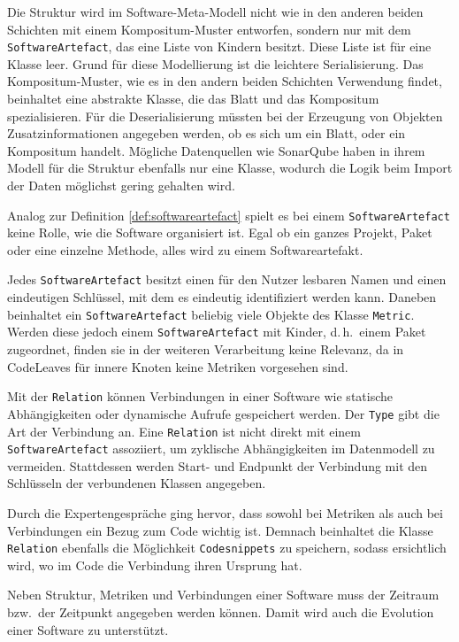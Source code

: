 Die Struktur wird im Software-Meta-Modell nicht wie in den anderen beiden Schichten mit einem Kompositum-Muster entworfen, sondern nur mit dem \texttt{SoftwareArtefact}, das eine Liste von Kindern besitzt. Diese Liste ist für eine Klasse leer. Grund für diese Modellierung ist die leichtere Serialisierung. Das Kompositum-Muster, wie es in den andern beiden Schichten Verwendung findet, beinhaltet eine abstrakte Klasse, die das Blatt und das Kompositum spezialisieren. Für die Deserialisierung müssten bei der Erzeugung von Objekten Zusatzinformationen angegeben werden, ob es sich um ein Blatt, oder ein Kompositum handelt. Mögliche Datenquellen wie SonarQube haben in ihrem Modell für die Struktur ebenfalls nur eine Klasse, wodurch die Logik beim Import der Daten möglichst gering gehalten wird.

Analog zur Definition \ref{def:softwareartefact} spielt es bei einem \texttt{SoftwareArtefact} keine Rolle, wie die Software organisiert ist. Egal ob ein ganzes Projekt, Paket oder eine einzelne Methode, alles wird zu einem Softwareartefakt.

Jedes \texttt{SoftwareArtefact} besitzt einen für den Nutzer lesbaren Namen und einen eindeutigen Schlüssel, mit dem es eindeutig identifiziert werden kann. Daneben beinhaltet ein \texttt{SoftwareArtefact} beliebig viele Objekte des Klasse \texttt{Metric}. Werden diese jedoch einem \texttt{SoftwareArtefact} mit Kinder, d.\,h.\ einem Paket zugeordnet, finden sie in der weiteren Verarbeitung keine Relevanz, da in CodeLeaves für innere Knoten keine Metriken vorgesehen sind.

Mit der \texttt{Relation} können Verbindungen in einer Software wie statische Abhängigkeiten oder dynamische Aufrufe gespeichert werden. Der \texttt{Type} gibt die Art der Verbindung an. Eine \texttt{Relation} ist nicht direkt mit einem \texttt{SoftwareArtefact} assoziiert, um zyklische Abhängigkeiten im Datenmodell zu vermeiden. Stattdessen werden Start- und Endpunkt der Verbindung mit den Schlüsseln der verbundenen Klassen angegeben.

Durch die Expertengespräche ging hervor, dass sowohl bei Metriken als auch bei Verbindungen ein Bezug zum Code wichtig ist. Demnach beinhaltet die Klasse \texttt{Relation} ebenfalls die Möglichkeit \texttt{Codesnippets} zu speichern, sodass ersichtlich wird, wo im Code die Verbindung ihren Ursprung hat.

Neben Struktur, Metriken und Verbindungen einer Software muss der Zeitraum bzw.\ der Zeitpunkt angegeben werden können. Damit wird auch die Evolution einer Software zu unterstützt.

